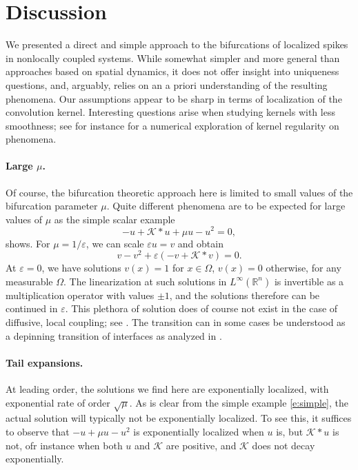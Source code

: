 \documentclass[10pt]{article}
\newcommand{\R}{\mathbb{R}}
\newcommand{\K}{\mathcal{K}}
\begin{document}
\section{Discussion}\label{s:d}

We presented a direct and simple approach to the bifurcations of localized spikes in nonlocally coupled systems. While somewhat simpler and more general than approaches based on spatial dynamics, it does not offer insight into uniqueness questions, and, arguably, relies on an a priori understanding of the resulting phenomena. Our assumptions appear to be sharp in terms of localization of the convolution kernel. Interesting questions arise when studying kernels with less smoothness; see for instance \cite{pin} for a numerical exploration of kernel regularity on phenomena. 


\paragraph{Large $\mu$.}
Of course, the bifurcation theoretic approach here is limited to small values of the bifurcation parameter $\mu$. Quite different phenomena are to be expected for large values of $\mu$ as the simple scalar example
\begin{equation}\label{e:simple}
-u+\K*u + \mu u - u^2=0,
\end{equation}
shows. For $\mu=1/\varepsilon$, we can scale $\varepsilon u =v$ and obtain
\[
v-v^2+\varepsilon(-v+\K*v)=0.
\]
At $\varepsilon=0$, we have solutions $v(x)=1$ for $x\in\Omega$, $v(x)=0$ otherwise, for any measurable $\Omega$. The linearization at such solutions in $L^\infty(\R^n)$ is invertible as a multiplication operator with values $\pm 1$, and the solutions therefore can be continued in $\varepsilon$. This plethora of solution does of course not exist in the case of diffusive, local coupling; see \cite{batespleth}. The transition can in some cases be understood as a depinning transition of interfaces as analyzed in \cite{pin}. 

\paragraph{Tail expansions.}
At leading order, the solutions we find here are exponentially localized, with exponential rate of order $\sqrt\mu$. As is clear from the simple example \eqref{e:simple}, the actual solution will typically not be exponentially localized. To see this, it suffices to observe that $-u+\mu u - u^2$ is exponentially localized when $u$ is, but $\K*u$ is not, ofr instance when both $u$ and $\K$ are positive, and $\K$ does not decay exponentially. 
\end{document}
